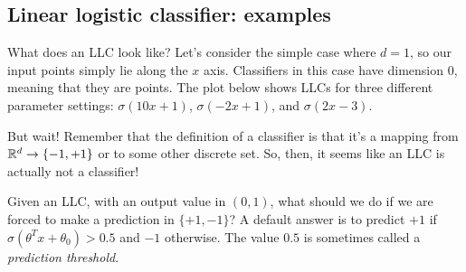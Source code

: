 
\subsection{Linear logistic classifier: examples}

What does an LLC look like?   Let's consider the
simple case where $d = 1$, so our input points simply lie along the
$x$ axis.  Classifiers in this case have dimension $0$, meaning that
they are points.
The plot below shows LLCs for three different parameter
settings: $\sigma(10x + 1)$, $\sigma(-2x + 1)$, and $\sigma(2x - 3).$
\begin{center}
\end{center}

But wait!  Remember that the definition of a classifier is that it's a mapping from $\mathbb{R}^d
  \rightarrow \{-1, +1\}$ or to some other discrete set.  So, then, it
seems like an LLC is actually not a classifier!

Given an LLC, with an output value in $(0, 1)$, what should we do if
we are forced to make a prediction in $\{+1, -1\}$?  A default answer
is to predict $+1$ if $\sigma(\theta^T x + \theta_0) > 0.5$ and $-1$
otherwise.  The value $0.5$ is sometimes called a {\em prediction
    threshold}.

